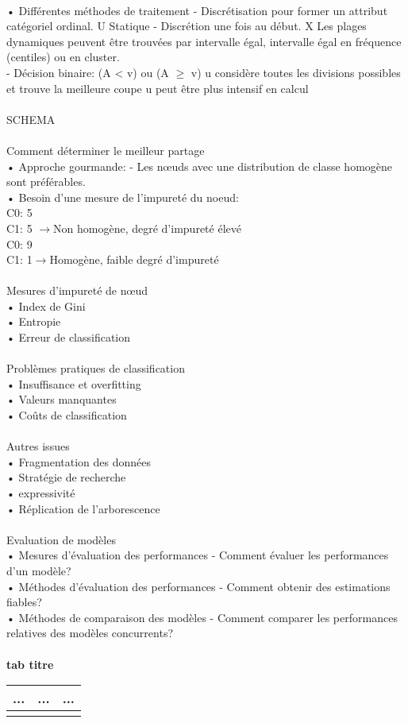 \documentclass[5pt]{article}
\begin{document}
\begin{scriptsize}
\\
• Différentes méthodes de traitement - Discrétisation pour former un attribut catégoriel ordinal. U Statique - Discrétion une fois au début. X Les plages dynamiques peuvent être trouvées par intervalle égal, intervalle égal en fréquence (centiles) ou en cluster.\\
- Décision binaire: (A < v) ou (A $\geq$ v) u considère toutes les divisions possibles et trouve la meilleure coupe u peut être plus intensif en calcul\\
\\
SCHEMA\\
\\
Comment déterminer le meilleur partage\\
• Approche gourmande: - Les nœuds avec une distribution de classe homogène sont préférables.\\
• Besoin d'une mesure de l'impureté du noeud:\\
C0: 5\\C1: 5 $\rightarrow$Non homogène, degré d'impureté élevé\\
C0: 9\\C1: 1$\rightarrow$Homogène, faible degré d'impureté\\
\\
Mesures d'impureté de nœud\\
• Index de Gini\\
• Entropie\\
• Erreur de classification\\
\\
Problèmes pratiques de classification\\
• Insuffisance et overfitting\\
• Valeurs manquantes\\
• Coûts de classification\\
\\
Autres issues\\
• Fragmentation des données\\
• Stratégie de recherche\\
• expressivité\\
• Réplication de l'arborescence\\
\\
Evaluation de modèles\\
• Mesures d'évaluation des performances - Comment évaluer les performances d'un modèle?\\
• Méthodes d'évaluation des performances - Comment obtenir des estimations fiables?\\
• Méthodes de comparaison des modèles - Comment comparer les performances relatives des modèles concurrents?\\
\\
\textbf{tab titre}  \\
\noindent
\begin{tabularx}{\linewidth}{|Y|Y|Y|}
\hline
... & ... & ...\\ \hline
\\ \hline
\end{tabularx} 

\end{scriptsize}
\end{document}
